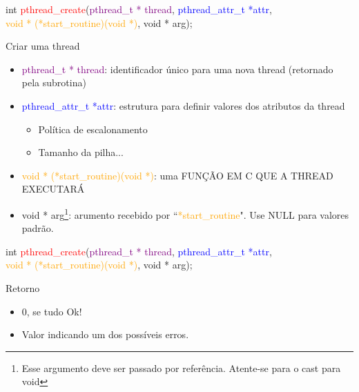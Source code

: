 \documentclass[10pt, xcolor=x11names]{beamer}
\begin{document}
\begin{frame}
	
int \textcolor{red}{pthread\_create}(\textcolor{purple}{pthread\_t * thread}, \textcolor{blue}{pthread\_attr\_t *attr},\\ \hspace{2.7cm} \textcolor{orange}{void * (*start\_routine)(void *)}, \textcolor[rgb]{.6,0,1}{void * arg});

	\begin{block}{Criar uma thread}
		\begin{itemize}[<+->]
			\item \textcolor{purple}{pthread\_t * thread}: identificador único para uma nova thread (retornado pela subrotina)
			\item \textcolor{blue}{pthread\_attr\_t *attr}: estrutura para definir valores dos atributos da thread
				\begin{itemize}
					\item Política de escalonamento
					\item Tamanho da pilha...
				\end{itemize}
			\item \textcolor{orange}{void * (*start\_routine)(void *)}: uma FUNÇÃO EM C QUE A THREAD EXECUTARÁ
			\item \textcolor[rgb]{.6,0,1}{void * arg}\footnote{Esse argumento deve ser passado por referência. Atente-se para o cast para void}: arumento recebido por ``\textcolor{orange}{*start\_routine}". Use NULL para valores padrão.
		\end{itemize}
	\end{block}
\end{frame}


\begin{frame}
	
int \textcolor{red}{pthread\_create}(\textcolor{purple}{pthread\_t * thread}, \textcolor{blue}{pthread\_attr\_t *attr},\\ \hspace{2.7cm} \textcolor{orange}{void * (*start\_routine)(void *)}, \textcolor[rgb]{.6,0,1}{void * arg});

	\begin{block}{Retorno}
		\begin{itemize}
			\item 0, se tudo Ok!
			\item Valor indicando um dos possíveis erros.
		\end{itemize}
	\end{block}

\end{frame}
\end{document}
